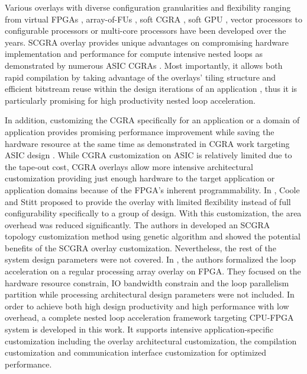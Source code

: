 Various overlays with diverse configuration granularities and flexibility 
ranging from virtual FPGAs \cite{Grant2011Malibu, ZUMA2012, Coole2010Intermediate}, 
array-of-FUs \cite{mesh-FUs,ferreira2011fpga,dspoverlay}, soft 
CGRA \cite{kissler2006dynamically, scgra}, soft GPU \cite{Guppy2012GPU-Like}, 
vector processors\cite{Yiannacouras2009FPS, MXP2013} to 
configurable processors or multi-core processors \cite{unnikrishnan2009application, 
MARC2010, Yiannacouras2007Exploration, Capalija2009coarse-grain, OCTAVO2012, iDEA2012} 
have been developed over the years. SCGRA overlay provides unique 
advantages on compromising hardware implementation 
and performance for compute intensive nested loops as demonstrated 
by numerous ASIC CGRAs \cite{tessier2001reconfigurable, compton2002reconfigurable}.
Most importantly, it allows both rapid compilation by taking advantage of 
the overlays' tiling structure \cite{ROB2015} and efficient bitstream 
reuse within the design iterations of an application \cite{scgra}, 
thus it is particularly promising for high productivity nested loop acceleration.

In addition, customizing the CGRA specifically for an application or a domain of application
provides promising performance improvement while saving the hardware resource at the same time as
demonstrated in CGRA work targeting ASIC design \cite{totem, zhou2014application, miniskar2014retargetable}. 
While CGRA customization on ASIC is relatively limited due to the tape-out cost, CGRA overlays
allow more intensive architectural customization providing just enough hardware
to the target application or application domains because of the FPGA's inherent programmability. 
In \cite{adjustable2015}, Coole and Stitt proposed to provide the overlay with limited flexibility
instead of full configurability specifically to a group of design. With this customization, the area
overhead was reduced significantly. The authors in \cite{Lin:2012:EDC:2460216.2460227} developed an SCGRA topology
customization method using genetic algorithm and showed the potential benefits of the SCGRA overlay
customization. Nevertheless, the rest of the system design parameters were not covered. In \cite{BondhugulaRS07},
the authors formalized the loop acceleration on a regular processing array overlay on FPGA. They
focused on the hardware resource constrain, IO bandwidth constrain and the loop parallelism partition while
processing architectural design parameters were not included.
In order to achieve both high design productivity and high performance with low overhead,  
a complete nested loop acceleration framework targeting CPU-FPGA system 
is developed in this work. It supports intensive application-specific
customization including the overlay architectural customization, 
the compilation customization and communication interface customization 
for optimized performance.  

